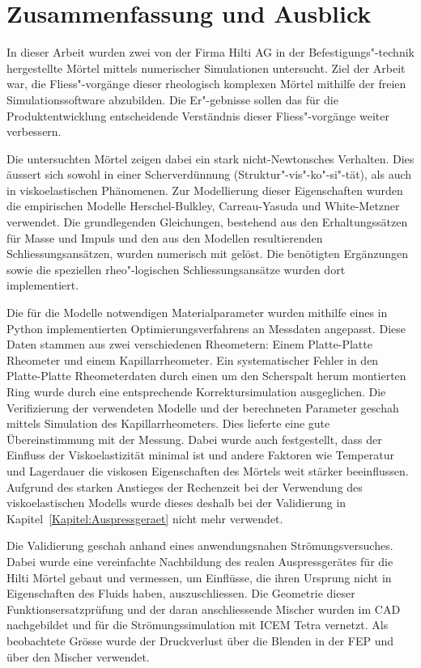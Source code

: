 \section{Zusammenfassung und Ausblick}
\label{Kapitel:Outlook}
In dieser Arbeit wurden zwei von der Firma Hilti AG in der Befestigungs"-technik hergestellte Mörtel mittels numerischer Simulationen untersucht.
Ziel der Arbeit war, die Fliess"-vorgänge dieser rheologisch komplexen Mörtel mithilfe der freien Simulationssoftware \openfoam{} abzubilden. Die Er"-gebnisse sollen das für die Produktentwicklung entscheidende Verständnis dieser Fliess"-vorgänge weiter verbessern.

Die untersuchten Mörtel zeigen dabei ein stark nicht-Newtonsches Verhalten.
Dies äussert sich sowohl in einer Scherverdünnung (Struktur"-vis"-ko"-si"-tät), als auch in viskoelastischen Phänomenen. Zur Modellierung dieser Eigenschaften wurden die empirischen Modelle Herschel-Bulkley, Carreau-Yasuda und White-Metzner verwendet.
Die grundlegenden Gleichungen, bestehend aus den Erhaltungssätzen für Masse und Impuls und den aus den Modellen resultierenden Schliessungsansätzen, wurden numerisch mit \openfoam{} gelöst. Die benötigten Ergänzungen sowie die speziellen rheo"-logischen Schliessungsansätze wurden dort implementiert.

Die für die Modelle notwendigen Materialparameter wurden mithilfe eines in Python implementierten Optimierungsverfahrens an Messdaten angepasst. Diese Daten stammen aus zwei verschiedenen Rheometern: Einem Platte-Platte Rheometer und einem Kapillarrheometer.
Ein systematischer Fehler in den Platte-Platte Rheometerdaten durch einen um den Scherspalt herum montierten Ring wurde durch eine entsprechende Korrektursimulation ausgeglichen.
Die Verifizierung der verwendeten Modelle und der berechneten Parameter geschah mittels Simulation des Kapillarrheometers. Dies lieferte eine gute Übereinstimmung mit der Messung.
Dabei wurde auch festgestellt, dass der Einfluss der Viskoelastizität minimal ist und andere Faktoren wie Temperatur und Lagerdauer die viskosen Eigenschaften des Mörtels weit stärker beeinflussen. 
Aufgrund des starken Anstieges der Rechenzeit bei der Verwendung des viskoelastischen Modells wurde dieses deshalb bei der Validierung in Kapitel~\ref{Kapitel:Auspressgeraet} nicht mehr verwendet.

Die Validierung geschah anhand eines anwendungsnahen Strömungsversuches. Dabei wurde eine vereinfachte Nachbildung des realen Auspressgerätes für die Hilti Mörtel gebaut und vermessen, um Einflüsse, die ihren Ursprung nicht in Eigenschaften des Fluids haben, auszuschliessen.
Die Geo\-me\-trie dieser Funktionsersatzprüfung und der daran anschliessende Mischer wurden im CAD nachgebildet und für die Strömungssimulation mit ICEM Tetra vernetzt.
Als beobachtete Grösse wurde der Druckverlust über die Blenden in der FEP und über den Mischer verwendet.

